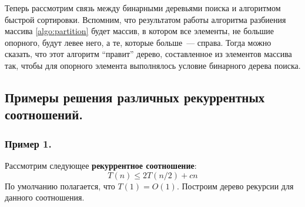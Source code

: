 \documentclass[a4paper,12pt]{article}
\begin{document}
Теперь рассмотрим связь между бинарными деревьями поиска и алгоритмом быстрой сортировки. Вспомним, что результатом работы алгоритма разбиения массива \ref{algo:partition} будет массив, в котором все элементы, не большие опорного, будут левее него, а те, которые больше~--- справа. Тогда можно сказать, что этот алгоритм ``правит'' дерево, составленное из элементов массива так, чтобы для опорного элемента выполнялось условие бинарного дерева поиска. 

\subsection{Примеры решения различных рекуррентных соотношений.}

\subsubsection{Пример 1.}

Рассмотрим следующее \textbf{рекуррентное соотношение}:
\[T(n) \leq 2T(n/2) + cn\]
По умолчанию полагается, что $T(1) = O(1)$. Построим дерево рекурсии для данного соотношения.
\end{document}
